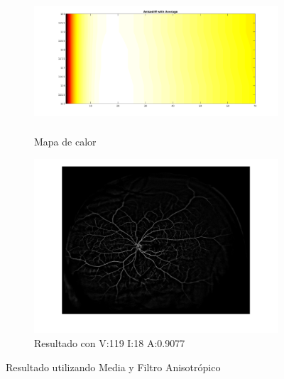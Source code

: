\begin{figure}[H]
\begin{subfigure}[b]{0.48\textwidth}
        \includegraphics[height=5.3cm,width=1\textwidth]{./Figures/Results/anisodiffWithAverageColorMap.png}
        \caption{Mapa de calor}
        \label{fig:thermalforanisodiffwithmedianacentered}
  \end{subfigure}
  \begin{subfigure}[b]{0.48\textwidth}
        \includegraphics[width=1\textwidth]{./Figures/Results/anisodiffWithAverageV119I18A09077.png}
        \caption{Resultado con V:119 I:18 A:0.9077}
        \label{fig:thermalforanisodiffwithmedianacentered}
  \end{subfigure}
	\label{fig:thermalfigure}
	\caption{Resultado utilizando Media y Filtro Anisotr\'opico}
\end{figure}

